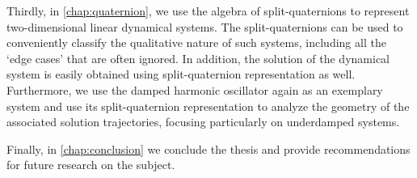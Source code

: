 Thirdly, in \cref{chap:quaternion}, we use the algebra of split-quaternions to represent two-dimensional linear dynamical systems. The split-quaternions can be used to conveniently classify the qualitative nature of such systems, including all the `edge cases' that are often ignored. In addition, the solution of the dynamical system is easily obtained using split-quaternion representation as well. Furthermore, we use the damped harmonic oscillator again as an exemplary system and use its split-quaternion representation to analyze the geometry of the associated solution trajectories, focusing particularly on underdamped systems.

Finally, in \cref{chap:conclusion} we conclude the thesis and provide recommendations for future research on the subject.


